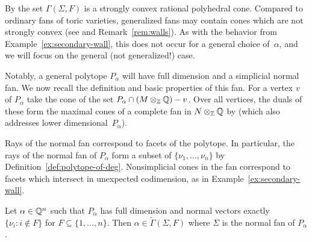 \documentclass{article}
\begin{document}
By \cite[Proposition 14.4.3]{CLS2011} the set $\Gamma(\Sigma,F)$ is a strongly convex rational polyhedral cone.  Compared to ordinary fans of toric varieties, generalized fans may contain cones which are not strongly convex (see \cite[Definition 6.2.2]{CLS2011} and Remark~\ref{rem:walls}).  As with the behavior from Example~\ref{ex:secondary-wall}, this does not occur for a general choice of~$\alpha$, and we will focus on the general (not generalized!) case.

Notably, a general polytope $P_\alpha$ will have full dimension and a simplicial normal fan.  We now recall the definition and basic properties of this fan.  For a vertex $v$ of $P_\alpha$ take the cone of the set $P_\alpha\cap(M\otimes_\mathbb Z\mathbb Q)-v$.  Over all vertices, the duals of these form the maximal cones of a complete fan in $N\otimes_\mathbb Z\mathbb Q$ by \cite[Proposition 14.2.10]{CLS2011} (which also addresses lower dimensional~$P_\alpha$).

Rays of the normal fan correspond to facets of the polytope.  In particular, the rays of the normal fan of $P_\alpha$ form a subset of $\{\nu_1,\ldots,\nu_n\}$ by Definition~\ref{def:polytope-of-deg}.  Nonsimplicial cones in the fan correspond to facets which intersect in unexpected codimension, as in Example~\ref{ex:secondary-wall}.

\begin{lemma}\label{lem:GKZ-def}
  Let $\alpha\in\mathbb Q^n$ such that $P_\alpha$ has full dimension and normal vectors exactly $\{\nu_i:i\notin F\}$ for $F\subseteq\{1,\ldots,n\}$.  Then $\alpha\in\tilde\Gamma(\Sigma,F)$ where $\Sigma$ is the normal fan of $P_\alpha$.
\end{lemma}
\end{document}
